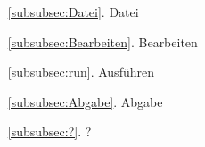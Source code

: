\documentclass[11pt]{article}
\begin{document}
\begin{itemize}
	\item[\ref{subsubsec:Datei}.] Datei
	\item[\ref{subsubsec:Bearbeiten}.] Bearbeiten
	\item[\ref{subsubsec:run}.] Ausführen
\item[\ref{subsubsec:Abgabe}.] Abgabe
	\item[\ref{subsubsec:?}.] ?
\end{itemize}
\end{document}
